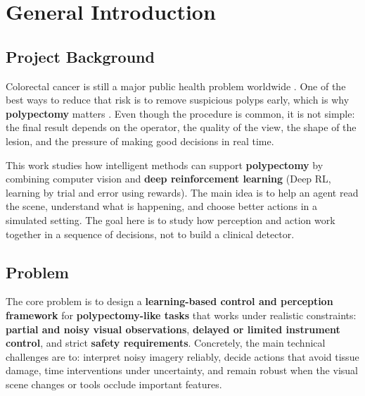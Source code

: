 \chapter*{General Introduction}
\label{chap:general_introduction}

\section*{Project Background}

Colorectal cancer is still a major public health problem worldwide \cite{sung2021globocan}.
One of the best ways to reduce that risk is to remove suspicious polyps early, which is
why \textbf{polypectomy} matters \cite{winawer1993polypectomy}. Even though the
procedure is common, it is not simple: the final result depends on the operator, the
quality of the view, the shape of the lesion, and the pressure of making good decisions
in real time.

This work studies how intelligent methods can support \textbf{polypectomy} by
combining computer vision and \textbf{deep reinforcement learning} (Deep RL, learning by trial and
error using rewards). The main idea is to help an agent read the scene, understand what
is happening, and choose better actions in a simulated setting. The goal here is to
study how perception and action work together in a sequence of decisions, not to build a
clinical detector.

\section*{Problem}
\vspace{-0.5em}
The core problem is to design a \textbf{learning-based control and perception framework}
for \textbf{polypectomy-like tasks} that works under realistic constraints:
\textbf{partial and noisy visual observations}, \textbf{delayed or limited instrument control},
and strict \textbf{safety requirements}. Concretely, the main technical challenges are to:
interpret noisy imagery reliably, decide actions that avoid tissue damage, time interventions
under uncertainty, and remain robust when the visual scene changes or tools occlude
important features.

